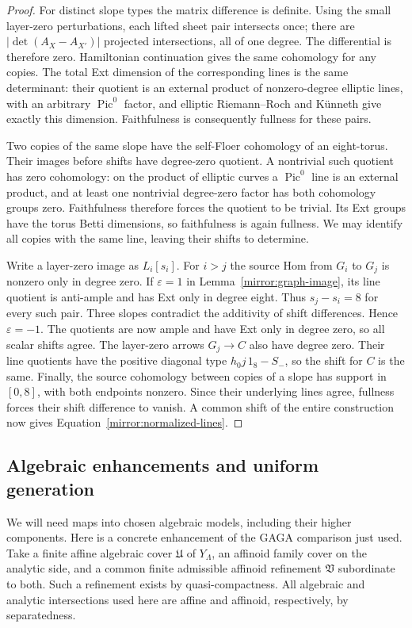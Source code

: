 \documentclass[11pt]{article}
\theoremstyle{definition}
\theoremstyle{remark}
\DeclareMathOperator{\Pic}{Pic}
\numberwithin{equation}{section}
\begin{document}
\begin{proof}
For distinct slope types the matrix difference is definite.  Using
the small layer-zero perturbations, each lifted sheet pair intersects
once; there are $|\det(A_X-A_{X'})|$ projected intersections, all of
one degree.  The differential is therefore zero.  Hamiltonian
continuation gives the same cohomology for any copies.  The total
Ext dimension of the corresponding lines is the same determinant:
their quotient is an external product of nonzero-degree elliptic
lines, with an arbitrary $\Pic^0$ factor, and elliptic
Riemann--Roch and K\"unneth give exactly this dimension.  Faithfulness
is consequently fullness for these pairs.

Two copies of the same slope have the self-Floer cohomology of an
eight-torus.  Their images before shifts have degree-zero quotient.
A nontrivial such quotient has zero cohomology: on the product of
elliptic curves a $\Pic^0$ line is an external product, and at least
one nontrivial degree-zero factor has both cohomology groups zero.
Faithfulness therefore forces the quotient to be trivial.  Its Ext
groups have the torus Betti dimensions, so faithfulness is again
fullness.  We may identify all copies with the same line, leaving
their shifts to determine.

Write a layer-zero image as $L_i[s_i]$.  For $i>j$ the source Hom
from $G_i$ to $G_j$ is nonzero only in degree zero.  If
$\varepsilon=1$ in Lemma~\ref{mirror:graph-image}, its line quotient
is anti-ample and has Ext only in degree eight.  Thus
$s_j-s_i=8$ for every such pair.  Three slopes contradict the
additivity of shift differences.  Hence $\varepsilon=-1$.
The quotients are now ample and have Ext only in degree zero, so
all scalar shifts agree.  The layer-zero arrows $G_j\to C$ also
have degree zero.  Their line quotients have the positive diagonal
type $h_0j\,1_8-S_-$, so the shift for $C$ is the same.
Finally, the source cohomology between copies of a slope has support
in $[0,8]$, with both endpoints nonzero.  Since their underlying
lines agree, fullness forces their shift difference to vanish.
A common shift of the entire construction now gives
Equation~\eqref{mirror:normalized-lines}.
\end{proof}

\subsection{Algebraic enhancements and uniform generation}

We will need maps into chosen algebraic models, including their
higher components.  Here is a concrete enhancement of the GAGA
comparison just used.  Take a finite affine algebraic cover
$\mathfrak U$ of $Y_\Lambda$, an affinoid family cover on the analytic
side, and a common finite admissible affinoid refinement
$\mathfrak V$ subordinate to both.  Such a refinement exists by
quasi-compactness.  All algebraic and analytic intersections used
here are affine and affinoid, respectively, by separatedness.
\end{document}
